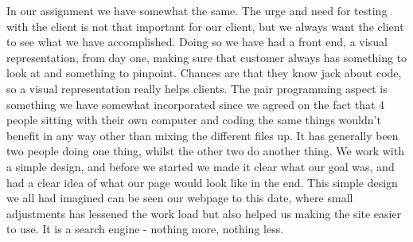\documentclass[a4paper]{article}
\begin{document}
In our assignment we have somewhat the same. The urge and need for testing with the client is not that important for our client, but we always want the client to see what we have accomplished. Doing so we have had a front end, a visual representation, from day one, making sure that customer always has something to look at and something to pinpoint. Chances are that they know jack about code, so a visual representation really helps clients. The pair programming aspect is something we have somewhat incorporated since we agreed on the fact that 4 people sitting with their own computer and coding the same things wouldn't benefit in any way other than mixing the different files up. It has generally been two people doing one thing, whilst the other two do another thing. We work with a simple design, and before we started we made it clear what our goal was, and had a clear idea of what our page would look like in the end. This simple design we all had imagined can be seen our webpage to this date, where small adjustments has lessened the work load but also helped us making the site easier to use. It is a search engine - nothing more, nothing less. 
\end{document}
